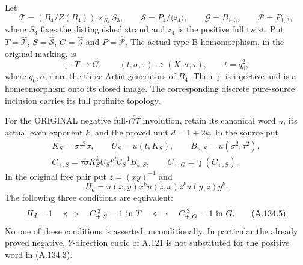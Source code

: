 Let
\[
 \mathcal T=(B_4/Z(B_4))\times_{S_4}S_3,\qquad
 \mathcal S=P_4/\langle z_4\rangle,\qquad
 \mathcal G=B_{1,3},\qquad \mathcal P=P_{1,3},
 \tag{A.134.1}
\]
where \(S_3\) fixes the distinguished strand and \(z_4\) is the
positive full twist. Put
\(T=\widehat{\mathcal T}\), \(S=\widehat{\mathcal S}\),
\(G=\widehat{\mathcal G}\) and \(P=\widehat{\mathcal P}\).
The actual type-B homomorphism, in the original marking, is
\[
 \jmath:T\longrightarrow G,\qquad
 (t,\sigma,\tau)\longmapsto(X,\sigma,\tau),
 \qquad t=q_0^2,
 \tag{A.134.2}
\]
where \(q_0,\sigma,\tau\) are the three Artin generators of \(B_4\).
Then \(\jmath\) is injective and is a homeomorphism onto its
closed image. The corresponding discrete pure-source inclusion
carries its full profinite topology.

For the ORIGINAL negative full-\(\widehat{GT}\) involution,
retain its canonical word \(u\), its actual even exponent \(k\),
and the proved unit \(d=1+2k\). In the source put
\[
 \begin{gathered}
 K_S=\sigma\tau^2\sigma,\qquad U_S=u(t,K_S),\qquad
 B_{u,S}=u(\sigma^2,\tau^2),\\
 C_{+,S}=\tau\sigma K_S^k U_S t^d U_S^{-1}B_{u,S},
 \qquad C_{+,G}=\jmath(C_{+,S}).
 \end{gathered}
 \tag{A.134.3}
\]
In the original free pair put \(z=(xy)^{-1}\) and
\[
 H_d=u(x,y)x^k u(z,x)z^k u(y,z)y^k.
 \tag{A.134.4}
\]
The following three conditions are equivalent:
\[
 H_d=1
 \quad\Longleftrightarrow\quad
 C_{+,S}^{\,3}=1\ \hbox{in }T
 \quad\Longleftrightarrow\quad
 C_{+,G}^{\,3}=1\ \hbox{in }G.
 \tag{A.134.5}
\]
No one of these conditions is asserted unconditionally.
In particular the already proved negative, \(Y\)-direction
cubic of A.121 is not substituted for the positive word
in (A.134.3).

